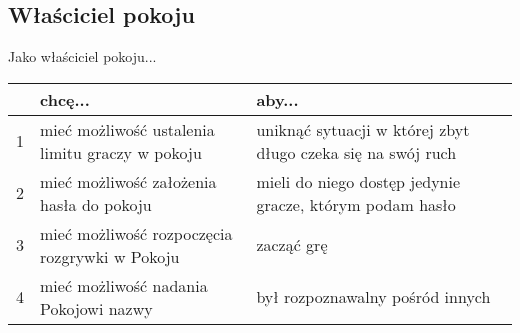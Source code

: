 \subsection{Właściciel pokoju}
Jako właściciel pokoju...
\begin{center}
    \begin{tabular}{ | l || p{5.5cm} | p{5.5cm} |}
    \hline
     & \textbf{chcę...} & \textbf{aby...} \\ \hline \hline
    1 & mieć możliwość ustalenia limitu graczy w pokoju & uniknąć sytuacji w której zbyt długo czeka się na swój ruch \\ \hline
    2 & mieć możliwość założenia hasła do pokoju & mieli do niego dostęp jedynie gracze, którym podam hasło \\ \hline
    3 & mieć możliwość rozpoczęcia rozgrywki w Pokoju & zacząć grę \\ \hline
    4 & mieć możliwość nadania Pokojowi nazwy & był rozpoznawalny pośród innych \\ \hline
    \end{tabular}
\end{center}


